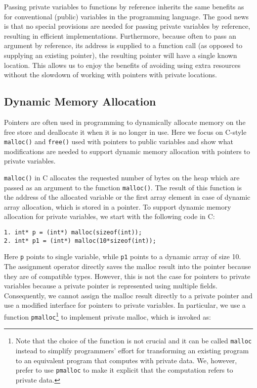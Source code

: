 \documentclass[11pt]{article}
\begin{document}
Passing private variables to functions by reference inherits the same
benefits as for conventional (public) variables in the programming language.
The good news is that no special provisions are needed for passing private
variables by reference, resulting in efficient implementations. Furthermore,
because often to pass an argument by reference, its address is supplied to a
function call (as opposed to supplying an existing pointer), the resulting
pointer will have a single known location. This allows us to enjoy the
benefits of avoiding using extra resources without the slowdown of working
with pointers with private locations. 

\subsection{Dynamic Memory Allocation}\label{sec:dmem}

Pointers are often used in programming to dynamically allocate memory on the
free store and deallocate it when it is no longer in use. Here we focus on
C-style \texttt{malloc()} and \texttt{free()} used with pointers to public
variables and show what modifications are needed to support dynamic memory
allocation with pointers to private variables.

\texttt{malloc()} in C allocates the requested number of bytes on the heap
which are passed as an argument to the function \texttt{malloc()}. The
result of this function is the address of the allocated variable or the
first array element in case of dynamic array allocation, which is stored in
a pointer. To support dynamic memory allocation for private variables, we
start with the following code in C: 

{\small \begin{verbatim}
1. int* p = (int*) malloc(sizeof(int));
2. int* p1 = (int*) malloc(10*sizeof(int));
\end{verbatim}}
\noindent Here \texttt{p} points to single variable, while \texttt{p1}
points to a dynamic array of size 10. The assignment operator directly saves
the malloc result into the pointer because they are of compatible types.
However, this is not the case for pointers to private variables because a
private pointer is represented using multiple fields. Consequently, we
cannot assign the malloc result directly to a private pointer and use a
modified interface for pointers to private variables. In particular, we use
a function \texttt{pmalloc}\footnote{Note that the choice of the function is
not crucial and it can be called \texttt{malloc} instead to simplify
programmers' effort for transforming an existing program to an equivalent
program that computes with private data. We, however, prefer to use
\texttt{pmalloc} to make it explicit that the computation refers to private
data.} to implement private malloc, which is invoked as:
\end{document}
